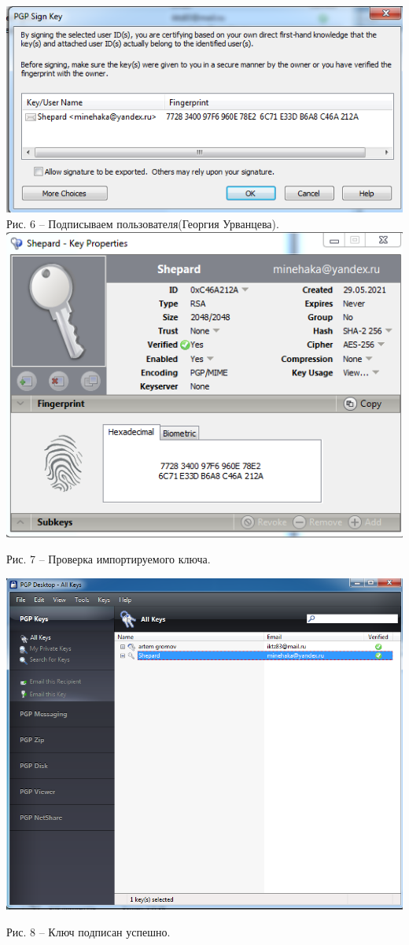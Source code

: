 \documentclass[a4paper,14pt]{extarticle}
\begin{document}
    \begin{center}
        \includegraphics[scale=0.6]{pics/6.png}\\

        Рис. 6 – Подписываем пользователя(Георгия Урванцева).
        \includegraphics[scale=0.6]{pics/8.png}
        
        Рис. 7 – Проверка импортируемого ключа.
    \end{center}
    \begin{center}
        \includegraphics[scale=0.45]{pics/7.png}

        Рис. 8 – Ключ подписан успешно.
    \end{center}
\end{document}
